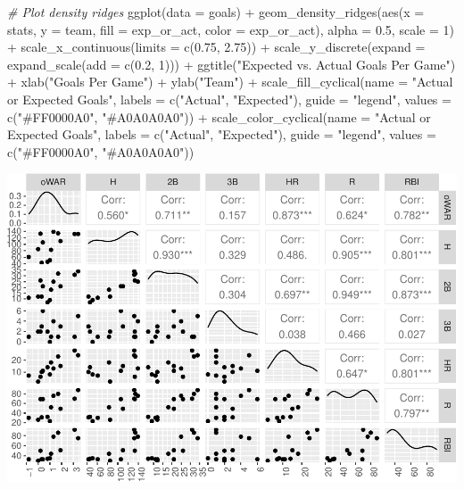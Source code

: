 \documentclass[
  11pt,
]{book}
\newenvironment{Shaded}{\begin{snugshade}}{\end{snugshade}}
\newcommand{\AttributeTok}[1]{\textcolor[rgb]{0.77,0.63,0.00}{#1}}
\newcommand{\CommentTok}[1]{\textcolor[rgb]{0.56,0.35,0.01}{\textit{#1}}}
\newcommand{\DecValTok}[1]{\textcolor[rgb]{0.00,0.00,0.81}{#1}}
\newcommand{\FloatTok}[1]{\textcolor[rgb]{0.00,0.00,0.81}{#1}}
\newcommand{\FunctionTok}[1]{\textcolor[rgb]{0.00,0.00,0.00}{#1}}
\newcommand{\NormalTok}[1]{#1}
\newcommand{\SpecialCharTok}[1]{\textcolor[rgb]{0.00,0.00,0.00}{#1}}
\newcommand{\StringTok}[1]{\textcolor[rgb]{0.31,0.60,0.02}{#1}}
\theoremstyle{definition}
\theoremstyle{definition}
\theoremstyle{definition}
\theoremstyle{definition}
\theoremstyle{remark}
\begin{document}
\begin{Shaded}
\begin{Highlighting}[]
\CommentTok{\# Plot density ridges}
\FunctionTok{ggplot}\NormalTok{(}\AttributeTok{data =}\NormalTok{ goals) }\SpecialCharTok{+} \FunctionTok{geom\_density\_ridges}\NormalTok{(}\FunctionTok{aes}\NormalTok{(}\AttributeTok{x =}\NormalTok{ stats, }\AttributeTok{y =}\NormalTok{ team, }\AttributeTok{fill =}\NormalTok{ exp\_or\_act,}
    \AttributeTok{color =}\NormalTok{ exp\_or\_act), }\AttributeTok{alpha =} \FloatTok{0.5}\NormalTok{, }\AttributeTok{scale =} \DecValTok{1}\NormalTok{) }\SpecialCharTok{+} \FunctionTok{scale\_x\_continuous}\NormalTok{(}\AttributeTok{limits =} \FunctionTok{c}\NormalTok{(}\FloatTok{0.75}\NormalTok{,}
    \FloatTok{2.75}\NormalTok{)) }\SpecialCharTok{+} \FunctionTok{scale\_y\_discrete}\NormalTok{(}\AttributeTok{expand =} \FunctionTok{expand\_scale}\NormalTok{(}\AttributeTok{add =} \FunctionTok{c}\NormalTok{(}\FloatTok{0.2}\NormalTok{, }\DecValTok{1}\NormalTok{))) }\SpecialCharTok{+} \FunctionTok{ggtitle}\NormalTok{(}\StringTok{"Expected vs. Actual Goals Per Game"}\NormalTok{) }\SpecialCharTok{+}
    \FunctionTok{xlab}\NormalTok{(}\StringTok{"Goals Per Game"}\NormalTok{) }\SpecialCharTok{+} \FunctionTok{ylab}\NormalTok{(}\StringTok{"Team"}\NormalTok{) }\SpecialCharTok{+} \FunctionTok{scale\_fill\_cyclical}\NormalTok{(}\AttributeTok{name =} \StringTok{"Actual or Expected Goals"}\NormalTok{,}
    \AttributeTok{labels =} \FunctionTok{c}\NormalTok{(}\StringTok{"Actual"}\NormalTok{, }\StringTok{"Expected"}\NormalTok{), }\AttributeTok{guide =} \StringTok{"legend"}\NormalTok{, }\AttributeTok{values =} \FunctionTok{c}\NormalTok{(}\StringTok{"\#FF0000A0"}\NormalTok{, }\StringTok{"\#A0A0A0A0"}\NormalTok{)) }\SpecialCharTok{+}
    \FunctionTok{scale\_color\_cyclical}\NormalTok{(}\AttributeTok{name =} \StringTok{"Actual or Expected Goals"}\NormalTok{, }\AttributeTok{labels =} \FunctionTok{c}\NormalTok{(}\StringTok{"Actual"}\NormalTok{,}
        \StringTok{"Expected"}\NormalTok{), }\AttributeTok{guide =} \StringTok{"legend"}\NormalTok{, }\AttributeTok{values =} \FunctionTok{c}\NormalTok{(}\StringTok{"\#FF0000A0"}\NormalTok{, }\StringTok{"\#A0A0A0A0"}\NormalTok{))}
\end{Highlighting}
\end{Shaded}

\includegraphics{series_files/figure-latex/unnamed-chunk-17-1.pdf}
\end{document}
